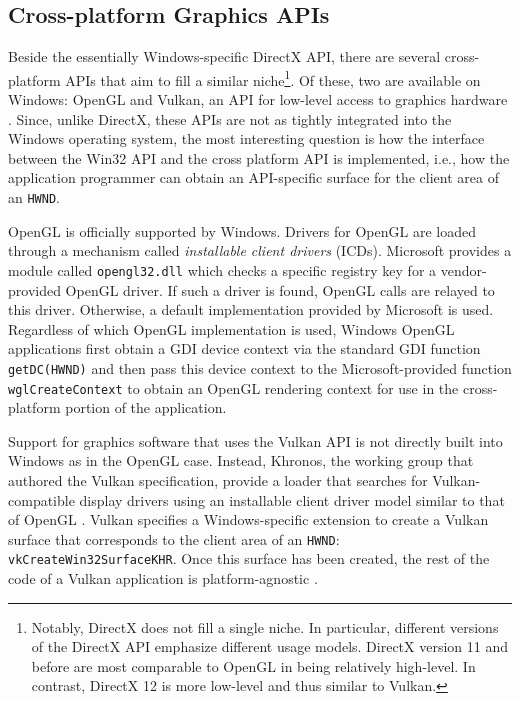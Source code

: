 		\subsection{Cross-platform Graphics APIs}
			Beside the essentially Windows-specific DirectX API, there are several
			cross-platform APIs that aim to fill a similar niche\footnote{Notably,
			DirectX does not fill a single niche. In particular,
			different versions of the DirectX API emphasize different usage models.
			DirectX version 11 and before are most comparable to OpenGL in being
			relatively high-level. In contrast, DirectX 12 is more low-level and
			thus similar to Vulkan.}. Of these, two are available on Windows: OpenGL
			and Vulkan, an API for low-level access to graphics hardware
			\cite[3]{vulkanspec}. Since, unlike DirectX, these APIs are not as tightly integrated
			into the Windows operating system, the most interesting question is
			how the interface between the Win32 API and the cross platform API
			is implemented, i.e., how the application programmer can obtain an
			API-specific surface for the client area of an \texttt{HWND}.

			OpenGL is officially supported by Windows. Drivers for OpenGL are
			loaded through a mechanism called \textit{installable client
			drivers} (ICDs). Microsoft provides a module called
			\texttt{opengl32.dll} which checks a specific registry key
			for a vendor-provided OpenGL driver. If such a driver is found,
			OpenGL calls are relayed to this driver. Otherwise, a
			default implementation provided by Microsoft is used. Regardless
			of which OpenGL implementation is used, Windows OpenGL applications first obtain
			a GDI device context via the standard GDI function \texttt{getDC(HWND)} and then pass this device
			context to the Microsoft-provided function \texttt{wglCreateContext}
			to obtain an OpenGL rendering context for use in the cross-platform portion
			of the application. \cite{oglrc,oglicd}

			Support for graphics software that uses the Vulkan API is not
			directly built into Windows as in the OpenGL case. Instead,
			Khronos, the working group that authored the Vulkan specification,
			provide a loader that searches for Vulkan-compatible display
			drivers using an installable client driver model similar to that of
			OpenGL \cite{vulkanloader}. Vulkan specifies a Windows-specific
			extension to create a Vulkan surface that corresponds to the client
			area of an \texttt{HWND}: \texttt{vkCreateWin32SurfaceKHR}. Once
			this surface has been created, the rest of the code of a Vulkan
			application is platform-agnostic \cite[799]{vulkanspec}.

